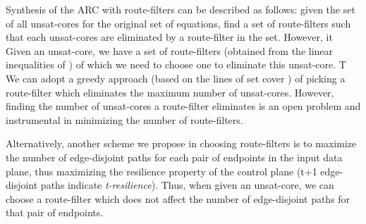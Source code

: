 Synthesis 
of the ARC with route-filters can be 
described as follows: given the set of all
unsat-cores for the original set of equations, find a 
set of route-filters such that each unsat-cores are eliminated
by a route-filter in the set. However, it 
Given an unsat-core, we have a set of route-filters (obtained
from the linear inequalities of ) of which we 
need to choose one to eliminate this unsat-core. T
We can 
adopt a greedy approach (based on the lines of 
set cover \cite{}) of picking a route-filter which 
eliminates the maximum number of unsat-cores. However, 
finding the number of unsat-cores a route-filter eliminates
is an open problem and instrumental in minimizing the number 
of route-filters.

Alternatively, another scheme we propose in choosing route-filters
is to maximize the number of edge-disjoint paths for each pair of
endpoints in the input data plane, thus maximizing the resilience 
property of the control plane (t+1 edge-disjoint paths indicate
{\em t-resilience}). Thus, when given an unsat-core, we can choose
a route-filter which does not affect the number of edge-disjoint paths
for that pair of endpoints.


